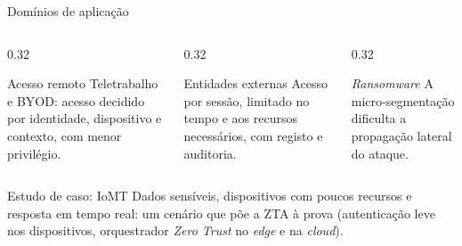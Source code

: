 \documentclass[aspectratio=169,11pt]{beamer}
\begin{document}
\begin{frame}{Domínios de aplicação}
  \begin{columns}[T]
    \begin{column}{0.32\textwidth}
      \begin{block}{Acesso remoto}
        Teletrabalho e BYOD: acesso decidido por identidade, dispositivo e contexto, com menor privilégio.
      \end{block}
    \end{column}
    \begin{column}{0.32\textwidth}
      \begin{block}{Entidades externas}
        Acesso por sessão, limitado no tempo e aos recursos necessários, com registo e auditoria.
      \end{block}
    \end{column}
    \begin{column}{0.32\textwidth}
      \begin{block}{\textit{Ransomware}}
        A micro-segmentação dificulta a propagação lateral do ataque.
      \end{block}
    \end{column}
  \end{columns}
  \vspace{0.3cm}
  \begin{alertblock}{Estudo de caso: IoMT}
    Dados sensíveis, dispositivos com poucos recursos e resposta em tempo real:
    um cenário que põe a ZTA à prova (autenticação leve nos dispositivos, orquestrador \textit{Zero Trust} no \textit{edge} e na \textit{cloud}).
  \end{alertblock}
\end{frame}
\end{document}
